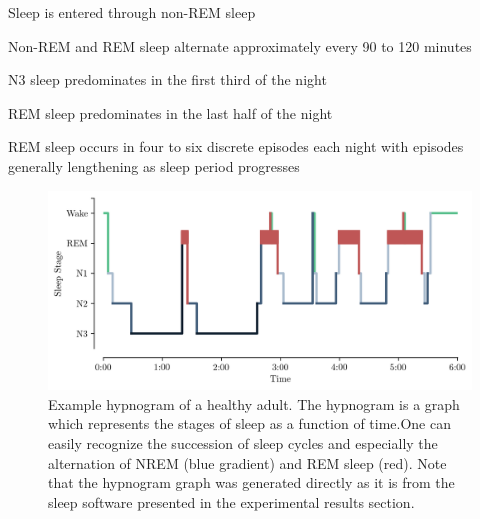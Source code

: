 \begin{my_list_num}
    \item Sleep is entered through non-REM sleep
    \item Non-REM and REM sleep alternate approximately every 90 to 120 minutes
	\item N3 sleep predominates in the first third of the night
	\item REM sleep predominates in the last half of the night
	\item REM sleep occurs in four to six discrete episodes each night with episodes generally lengthening as sleep period progresses
\end{my_list_num}

\vspace{10mm}

\begin{figure}[htb]
	\includegraphics[width=\textwidth]{Fig/Intro/Intro_Hypnogram/Intro_Hypnogram.png}
	\caption[Example hypnogram of a healthy adult]{Example hypnogram of a healthy adult. The hypnogram is a graph which represents the stages of sleep as a function of time.One can easily recognize the succession of sleep cycles and especially the alternation of NREM (blue gradient) and REM sleep (red). Note that the hypnogram graph was generated directly as it is from the sleep software presented in the experimental results section.}
	\label{fig:intro:hypno}
\end{figure}

%


